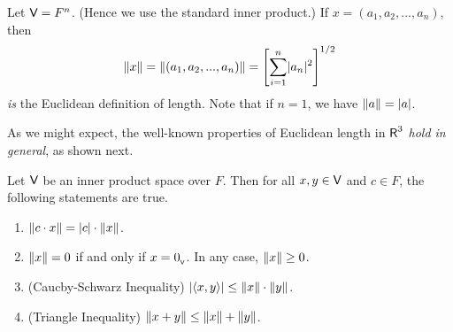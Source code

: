 \begin{example} \label{example 6.1.6}
Let \(\textsf{V} = F^n\).
(Hence we use the standard inner product.)
If \(x = (a_1, a_2, ..., a_n)\), then
\[
    \left\lVert x\right\rVert = \left\lVert(a_1, a_2, ..., a_n)\right\rVert = \left[ \sum_{i = 1}^n \lvert a_n\rvert^2 \right]^{1/2}
\]
\emph{is} the Euclidean definition of length.
Note that if \(n = 1\), we have \(\left\lVert a\right\rVert = \lvert a\rvert\).
\end{example}

As we might expect, the well-known properties of Euclidean length in \(\textsf{R}^3\) \emph{hold in general}, as shown next.

\begin{theorem} \label{thm 6.2}
Let \(\textsf{V}\) be an inner product space over \(F\).
Then for all \(x, y \in \textsf{V}\) and \(c \in F\), the following statements are true.
\begin{enumerate}
\item \(\left\lVert c \cdot x\right\rVert = \lvert c\rvert \cdot \left\lVert x\right\rVert\).
\item \(\left\lVert x\right\rVert = 0\) if and only if \(x = 0_{_{\textsf{V}}}\).
In any case, \(\left\lVert x\right\rVert \ge 0\).
\item (Caucby-Schwarz Inequality) \(\lvert\left< x, y \right>\rvert \le \left\lVert x\right\rVert \cdot \left\lVert y\right\rVert\).
\item (Triangle Inequality) \(\left\lVert x + y\right\rVert \le \left\lVert x\right\rVert + \left\lVert y\right\rVert\).
\end{enumerate}
\end{theorem}

